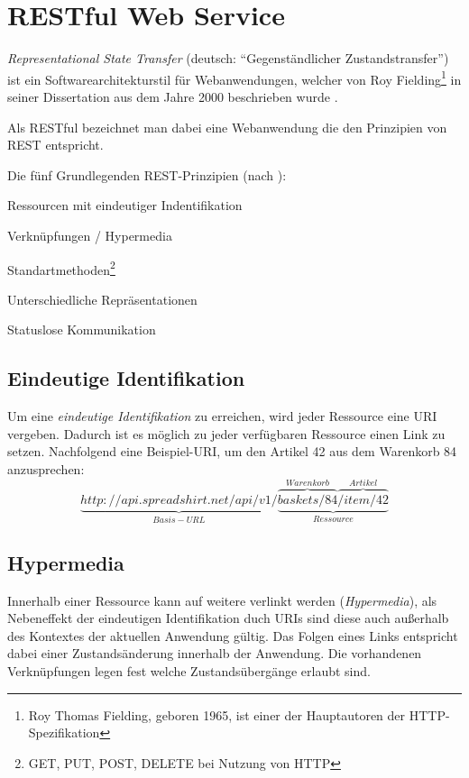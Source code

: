 \section{RESTful Web Service}

\emph{Representational State Transfer} (deutsch: \enquote{Gegenständlicher Zustandstransfer}) ist ein Softwarearchitekturstil für Webanwendungen, welcher von Roy Fielding\footnote{Roy Thomas Fielding, geboren 1965, ist einer der Hauptautoren der HTTP-Spezifikation} in seiner Dissertation aus dem Jahre 2000  beschrieben wurde \cite{fieldingDissertation}. 

Als \gls{RESTful} bezeichnet man dabei eine Webanwendung die den Prinzipien von \gls{REST} entspricht. 

Die fünf Grundlegenden REST-Prinzipien (nach \cite{Tilkov09}):
\begin{compactitem}
	\item Ressourcen mit eindeutiger Indentifikation
	\item Verknüpfungen / Hypermedia
	\item Standartmethoden\footnote{GET, PUT, POST, DELETE bei Nutzung von HTTP}
	\item Unterschiedliche Repräsentationen
	\item Statuslose Kommunikation
\end{compactitem}

\subsection{Eindeutige Identifikation}

Um eine \emph{eindeutige Identifikation} zu erreichen, wird jeder Ressource eine \gls{URI} vergeben. Dadurch ist es möglich zu jeder verfügbaren Ressource einen Link zu setzen. 
Nachfolgend eine Beispiel-\gls{URI}, um den Artikel 42 aus dem Warenkorb 84 anzusprechen:
\[
	\underbrace{http://api.spreadshirt.net/api/v1/}_{Basis-URL}\underbrace{\overbrace{baskets/84}^{Warenkorb}\overbrace{/item/42}^{Artikel}}_{Ressource}
	\label{RESTexampleURL}
\]

\subsection{Hypermedia}

Innerhalb einer Ressource kann auf weitere verlinkt werden (\emph{Hypermedia}), als Nebeneffekt der eindeutigen Identifikation duch \glspl{URI} sind diese auch außerhalb des Kontextes der aktuellen Anwendung gültig. Das Folgen eines Links entspricht dabei einer Zustandsänderung innerhalb der Anwendung.
Die vorhandenen Verknüpfungen legen fest welche Zustandsübergänge  erlaubt sind.

